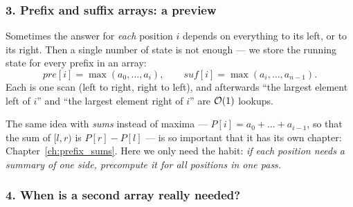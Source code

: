 \subsubsection*{3. Prefix and suffix arrays: a preview}

Sometimes the answer for \emph{each} position $i$ depends on everything to its left, or to its right. Then a single number of state is not enough --- we store the running state for every prefix in an array:
\[
\mathit{pre}[i] = \max(a_0, \dots, a_i), \qquad \mathit{suf}[i] = \max(a_i, \dots, a_{n-1}).
\]
Each is one scan (left to right, right to left), and afterwards ``the largest element left of $i$'' and ``the largest element right of $i$'' are $\mathcal{O}(1)$ lookups.

\begin{diagrambox}
\end{diagrambox}

The same idea with \emph{sums} instead of maxima --- $P[i] = a_0 + \dots + a_{i-1}$, so that the sum of $[l, r)$ is $P[r] - P[l]$ --- is so important that it has its own chapter: Chapter~\ref{ch:prefix_sums}. Here we only need the habit: \emph{if each position needs a summary of one side, precompute it for all positions in one pass.}

\subsubsection*{4. When is a second array really needed?}

